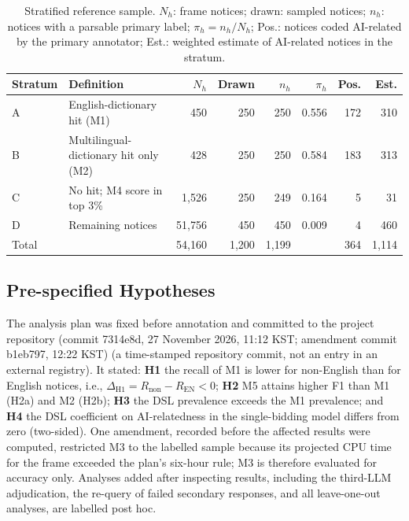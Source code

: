 \documentclass[runningheads]{llncs}
\begin{document}
\begin{table}[t]
\caption{Stratified reference sample. $N_h$: frame notices; drawn: sampled notices; $n_h$: notices with a parsable primary label; $\pi_h=n_h/N_h$; Pos.: notices coded AI-related by the primary annotator; Est.: weighted estimate of AI-related notices in the stratum.}\label{tab:design}
\centering
\begin{tabular}{llrrrrrr}
\toprule
Stratum & Definition & $N_h$ & Drawn & $n_h$ & $\pi_h$ & Pos. & Est. \\
\midrule
A & English-dictionary hit (M1) & 450 & 250 & 250 & 0.556 & 172 & 310 \\
B & Multilingual-dictionary hit only (M2) & 428 & 250 & 250 & 0.584 & 183 & 313 \\
C & No hit; M4 score in top 3\% & 1,526 & 250 & 249 & 0.164 & 5 & 31 \\
D & Remaining notices & 51,756 & 450 & 450 & 0.009 & 4 & 460 \\
\midrule
Total & & 54,160 & 1,200 & 1,199 & & 364 & 1,114 \\
\bottomrule
\end{tabular}
\end{table}

\subsection{Pre-specified Hypotheses}
The analysis plan was fixed before annotation and committed to the project repository (commit 7314e8d, 27 November 2026, 11:12 KST; amendment commit b1eb797, 12:22 KST)
(a time-stamped repository commit, not an entry in an external registry). It stated: \textbf{H1} the recall of M1 is lower for non-English than for English notices, i.e., $\Delta_{\mathrm{H1}}=R_{\mathrm{non}}-R_{\mathrm{EN}}<0$; \textbf{H2} M5 attains higher F1 than M1 (H2a) and M2 (H2b); \textbf{H3} the DSL prevalence exceeds the M1 prevalence; and \textbf{H4} the DSL coefficient on AI-relatedness in the single-bidding model differs from zero (two-sided). One amendment, recorded before the affected results were computed, restricted M3 to the labelled sample because its projected CPU time for the frame exceeded the plan's six-hour rule; M3 is therefore evaluated for accuracy only. Analyses added after inspecting results, including the third-LLM adjudication, the re-query of failed secondary responses, and all leave-one-out analyses, are labelled post hoc.

\end{document}
